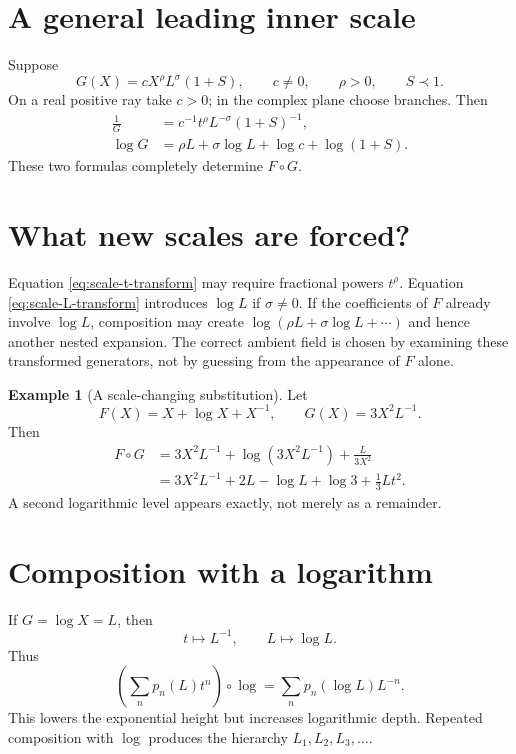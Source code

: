 \documentclass[11pt,oneside]{book}
\theoremstyle{definition}
\newtheorem{example}[theorem]{Example}
\theoremstyle{remark}
\newcommand{\precdom}{\prec}
\newcommand{\compose}{\mathbin{\circ}}
\begin{document}
\section{A general leading inner scale}
Suppose
\begin{equation}\label{eq:G-general-leading}
 G(X)=cX^\rho L^\sigma(1+S),
 \qquad c\ne0,
 \qquad \rho>0,
 \qquad S\precdom1.
\end{equation}
On a real positive ray take $c>0$; in the complex plane choose branches.
Then
\begin{align}
 \frac1G&=c^{-1}t^\rho L^{-\sigma}(1+S)^{-1},
 \label{eq:scale-t-transform}\\
 \log G&=\rho L+\sigma\log L+\log c+\log(1+S).
 \label{eq:scale-L-transform}
\end{align}
These two formulas completely determine $F\compose G$.

\section{What new scales are forced?}
Equation \eqref{eq:scale-t-transform} may require fractional powers $t^\rho$.
Equation \eqref{eq:scale-L-transform} introduces $\log L$ if $\sigma\ne0$.
If the coefficients of $F$ already involve $\log L$, composition may create
$\log(\rho L+\sigma\log L+\cdots)$ and hence another nested expansion.  The
correct ambient field is chosen by examining these transformed generators,
not by guessing from the appearance of $F$ alone.

\begin{example}[A scale-changing substitution]
Let
\[
 F(X)=X+\log X+X^{-1},
 \qquad
 G(X)=3X^2L^{-1}.
\]
Then
\begin{align*}
 F\compose G
 &=3X^2L^{-1}
 +\log(3X^2L^{-1})
 +\frac{L}{3X^2}\\
 &=3X^2L^{-1}+2L-\log L+\log3+\frac13Lt^2.
\end{align*}
A second logarithmic level appears exactly, not merely as a remainder.
\end{example}

\section{Composition with a logarithm}
If $G=\log X=L$, then
\[
 t\mapsto L^{-1},
 \qquad
 L\mapsto\log L.
\]
Thus
\[
 \left(\sum_np_n(L)t^n\right)\compose\log
 =\sum_np_n(\log L)L^{-n}.
\]
This lowers the exponential height but increases logarithmic depth.  Repeated
composition with $\log$ produces the hierarchy
$L_1,L_2,L_3,\ldots$.
\end{document}
